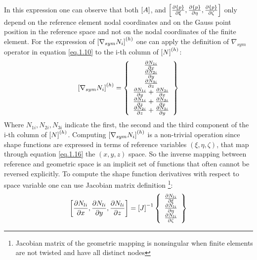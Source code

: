 In this expression one can observe that both $\left[{A}\right]$, and $\left[{\frac{\partial \left\lbrace{p}\right \rbrace}{\partial \xi},\frac{\partial \left\lbrace{p}\right \rbrace}{\partial \eta},\frac{\partial \left\lbrace{p}\right \rbrace}{\partial \zeta}}\right] $ only depend on the reference element nodal coordinates and on the Gauss point position in the reference space and not on the nodal coordinates of the finite element.
For the expression of $\left[{\nabla_{sym}N_i}\right]^{(h)}$ one can apply the definition of $\nabla_{sym}$ operator in equation \eqref{eq.1.10} to the i-th column of $\left[{N}\right]^{(h)}$:
\begin{equation}
	\left[{\nabla_{sym}N_i}\right]^{(h)}=\left\lbrace{\begin{array}{c}
		\frac{\partial N_{1i}}{\partial x}\\\frac{\partial N_{2i}}{\partial y}\\\frac{\partial N_{3i}}{\partial z}\\
		\frac{\partial N_{1i}}{\partial y}+\frac{\partial N_{2i}}{\partial x}\\\frac{\partial N_{1i}}{\partial z}+\frac{\partial N_{3i}}{\partial x}\\\frac{\partial N_{2i}}{\partial z}+\frac{\partial N_{3i}}{\partial y}
		\end{array}}\right \rbrace
\end{equation}
Where $N_{1i},N_{2i},N_{3i}$ indicate the first, the second and the third component of the i-th column of  $\left[{N}\right]^{(h)}$.
Computing $\left[{\nabla_{sym}N_i}\right]^{(h)}$ is a non-trivial operation since shape functions are expressed in terms of reference variables $(\xi,\eta,\zeta)$, that map through equation \eqref{eq.1.16} the $(x,y,z)$ space. So the inverse mapping between reference and geometric space is an implicit set of functions that often cannot be reversed explicitly. To compute the shape function derivatives with respect to space variable one can use Jacobian matrix definition \footnote{Jacobian matrix of the geometric mapping is nonsingular when finite elements are not twisted and have all distinct nodes}:
\begin{equation}
\left[{\frac{\partial N_{li}}{\partial x},\frac{\partial N_{li}}{\partial y},\frac{\partial N_{li}}{\partial z}}\right]= 
\left[{J}\right]^{-1}\left\lbrace{\begin{array}{c}
	\frac{\partial N_{li}}{\partial \xi}\\\frac{\partial N_{li}}{\partial \eta}\\\frac{\partial N_{li}}{\partial \zeta}\end{array}}\right \rbrace 
\end{equation}
